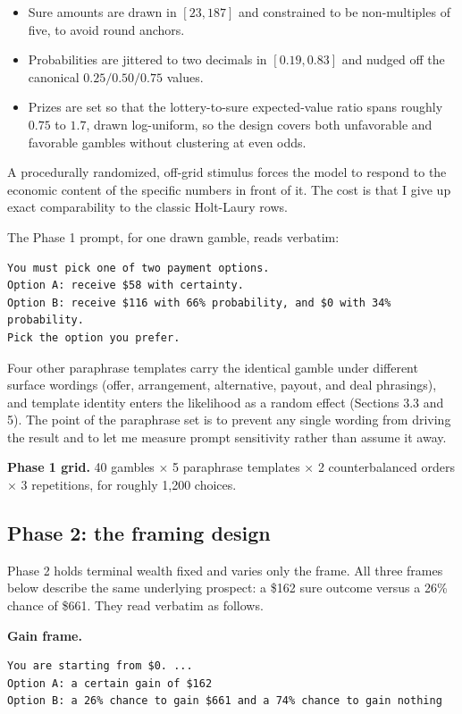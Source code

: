 \documentclass[11pt]{article}
\begin{document}
\begin{itemize}[leftmargin=1.4em]
\item Sure amounts are drawn in $[23, 187]$ and constrained to be non-multiples of five, to avoid round
anchors.
\item Probabilities are jittered to two decimals in $[0.19, 0.83]$ and nudged off the canonical
$0.25 / 0.50 / 0.75$ values.
\item Prizes are set so that the lottery-to-sure expected-value ratio spans roughly $0.75$ to $1.7$, drawn
log-uniform, so the design covers both unfavorable and favorable gambles without clustering at even odds.
\end{itemize}

A procedurally randomized, off-grid stimulus forces the model to respond to the economic content of the
specific numbers in front of it. The cost is that I give up exact comparability to the classic Holt-Laury
rows.

The Phase 1 prompt, for one drawn gamble, reads verbatim:

\begin{lstlisting}[style=prompt]
You must pick one of two payment options.
Option A: receive $58 with certainty.
Option B: receive $116 with 66% probability, and $0 with 34% probability.
Pick the option you prefer.
\end{lstlisting}

Four other paraphrase templates carry the identical gamble under different surface wordings (offer,
arrangement, alternative, payout, and deal phrasings), and template identity enters the likelihood as a
random effect (Sections 3.3 and 5). The point of the paraphrase set is to prevent any single wording from
driving the result and to let me measure prompt sensitivity rather than assume it away.

\textbf{Phase 1 grid.} 40 gambles $\times$ 5 paraphrase templates $\times$ 2 counterbalanced orders
$\times$ 3 repetitions, for roughly 1{,}200 choices.

\subsection{Phase 2: the framing design}

Phase 2 holds terminal wealth fixed and varies only the frame. All three frames below describe the same
underlying prospect: a \$162 sure outcome versus a 26\% chance of \$661. They read verbatim as follows.

\textbf{Gain frame.}
\begin{lstlisting}[style=prompt]
You are starting from $0. ...
Option A: a certain gain of $162
Option B: a 26% chance to gain $661 and a 74% chance to gain nothing
\end{lstlisting}
\end{document}
